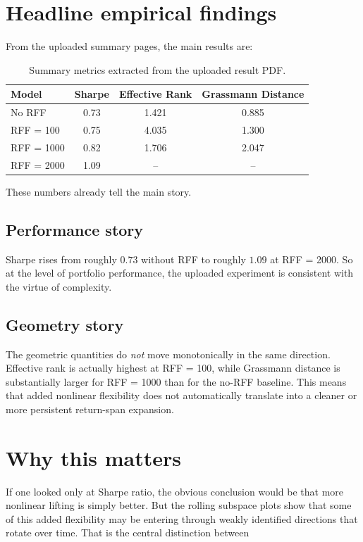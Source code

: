 \documentclass[11pt]{article}
\begin{document}
\section{Headline empirical findings}

From the uploaded summary pages, the main results are:

\begin{table}[H]
\centering
\begin{tabular}{>{\raggedright\arraybackslash}p{2.1in}ccc}
\toprule
Model & Sharpe & Effective Rank & Grassmann Distance \\
\midrule
No RFF & 0.73 & 1.421 & 0.885 \\
RFF = 100 & 0.75 & 4.035 & 1.300 \\
RFF = 1000 & 0.82 & 1.706 & 2.047 \\
RFF = 2000 & 1.09 & -- & -- \\
\bottomrule
\end{tabular}
\caption{Summary metrics extracted from the uploaded result PDF.}
\end{table}

These numbers already tell the main story.

\subsection*{Performance story}
Sharpe rises from roughly $0.73$ without RFF to roughly $1.09$ at RFF = 2000. So at the level of portfolio performance,
the uploaded experiment is consistent with the virtue of complexity.

\subsection*{Geometry story}
The geometric quantities do \emph{not} move monotonically in the same direction. Effective rank is actually highest at RFF = 100,
while Grassmann distance is substantially larger for RFF = 1000 than for the no-RFF baseline. This means that added nonlinear flexibility
does not automatically translate into a cleaner or more persistent return-span expansion.

\section{Why this matters}

If one looked only at Sharpe ratio, the obvious conclusion would be that more nonlinear lifting is simply better.
But the rolling subspace plots show that some of this added flexibility may be entering through weakly identified directions that rotate over time.
That is the central distinction between
\end{document}
